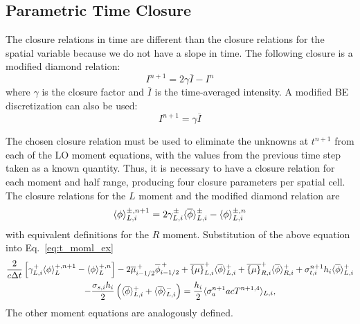 \subsection{Parametric Time Closure}
%
The closure relations in time are different than the closure relations for the spatial
variable because we do not have a slope in time.  The following closure is a modified diamond
relation:
\begin{equation}\label{eq:tc_diam}
    I^{n+1} = 2\gamma \overline{I} - I^{n}
\end{equation}
where $\gamma$ is the closure factor and $\overline{I}$ is the time-averaged
intensity.  A modified BE discretization can also be used:
\begin{equation}\label{eq:tc_avg}
    I^{n+1} = \gamma \overline{I}
\end{equation}

The chosen closure relation must be used to eliminate the unknowns at $t^{n+1}$ from each
of the LO moment equations, with the values from the previous time step taken as a known quantity.  Thus, it is necessary to have a closure relation for each moment and half
range, producing four closure parameters per spatial cell.  The closure relations for the
$L$ moment and the modified diamond relation are
\begin{equation}\label{eq:tc_diam_l}
    \langle \phi \rangle_{L,i}^{\pm,n+1} = 2 \gamma_{L,i}^{\pm}\langle \overline\phi \rangle_{L,i}^{\pm} -
    \langle \phi \rangle_{L,i}^{\pm,n}
\end{equation}
with equivalent definitions for the $R$ moment.  Substitution of the above equation into
Eq.~\eqref{eq:t_moml_ex}
\begin{multline}
    \frac{2}{c\Delta t}\left[ \gamma_{L,i}^{+} \langle \phi \rangle_L^{+,n+1} - \langle \phi \rangle_L^{+,n} \right]
    -2\overline {\mu}_{i-1/2}^{\,+} \overline \phi_{i-1/2}^{\,+} + \overline{\left\{ \mu \right\}}_{L,i}^{+}
  \langle \overline{\phi} \rangle_{L,i}^{+}
  +  \overline{\left\{ \mu \right\}}_{R,i}^{+}
  \langle \overline{\phi} \rangle_{R,i}^{+} +  \sigma_{t,i}^{n+1} h_i 
  \langle \overline\phi \rangle_{L,i}^{+} \\-  \frac{\sigma_{s,i} h_i}{2} \left( \langle \overline{\phi} \rangle_{L,i}^{+} +
  \langle \overline{\phi} \rangle_{L,i}^{-}\right) = \frac{h_i}{2} \langle \sigma_a^{n+1} a c T^{n+1,4} \rangle_{L,i},
\end{multline}
The other moment equations are analogously defined.  

